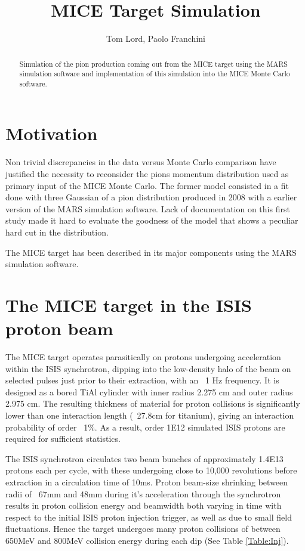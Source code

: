 \documentclass[a4paper,11pt]{article}
\title{MICE Target Simulation}
\author{Tom Lord, Paolo Franchini}
\begin{document}
\maketitle
\tableofcontents

\begin{abstract}
Simulation of the pion production coming out from the MICE target using the MARS simulation software and implementation of this simulation into the MICE Monte Carlo software.
\end{abstract}

\newpage

\section{Motivation}

Non trivial discrepancies in the data versus Monte Carlo comparison have justified the necessity to reconsider the pions momentum distribution used as primary input of the MICE Monte Carlo.
The former model consisted in a fit done with three Gaussian of a pion distribution produced in 2008 with a earlier version of the MARS simulation software. Lack of documentation on this first study made it hard to evaluate the goodness of the model that shows a peculiar hard cut in the distribution.

The MICE target has been described in its major components using the MARS simulation software.
\section{The MICE target in the ISIS proton beam}

The MICE target operates parasitically on protons undergoing acceleration within the ISIS synchrotron, dipping into the low-density halo of the beam on selected pulses just prior to their extraction, with an ~1 Hz frequency. It is designed as a bored TiAl cylinder with inner radius 2.275 cm and outer radius 2.975 cm. The resulting thickness of material for proton collisions is significantly lower than one interaction length (~27.8cm for titanium), giving an interaction probability of order ~1\%. As a result, order 1E12 simulated ISIS protons are required for sufficient statistics. 

The ISIS synchrotron circulates two beam bunches of approximately 1.4E13 protons each per cycle, with these undergoing close to 10,000 revolutions before extraction in a circulation time of 10ms. Proton beam-size shrinking between radii of ~67mm and 48mm during it's acceleration through the synchrotron results in proton collision energy and beamwidth both varying in time with respect to the initial ISIS proton injection trigger, as well as due to small field fluctuations. Hence the target undergoes many proton collisions of between 650MeV and 800MeV collision energy during each dip (See Table \ref{Table:Inj}). 
\end{document}
